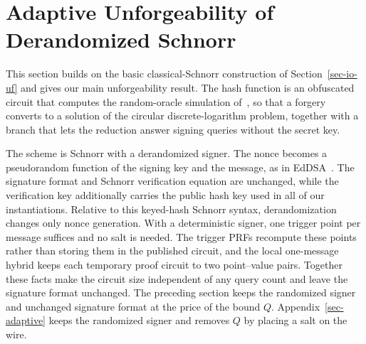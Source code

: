 \section{Adaptive Unforgeability of Derandomized Schnorr} \label{sec-derand}


This section builds on the basic classical-Schnorr construction of Section~\ref{sec-io-uf} and gives our main unforgeability result. The hash function is an obfuscated circuit that computes the random-oracle simulation of~\cite{C:CFOS25}, so that a forgery converts to a solution of the circular discrete-logarithm problem, together with a branch that lets the reduction answer signing queries without the secret key.

The scheme is Schnorr with a derandomized signer. The nonce becomes a pseudorandom function of the signing key and the message, as in EdDSA~\cite{eddsa}. The signature format and Schnorr verification equation are unchanged, while the verification key additionally carries the public hash key used in all of our instantiations. Relative to this keyed-hash Schnorr syntax, derandomization changes only nonce generation. With a deterministic signer, one trigger point per message suffices and no salt is needed. The trigger PRFs recompute these points rather than storing them in the published circuit, and the local one-message hybrid keeps each temporary proof circuit to two point--value pairs. Together these facts make the circuit size independent of any query count and leave the signature format unchanged. The preceding section keeps the randomized signer and unchanged signature format at the price of the bound $Q$. Appendix~\ref{sec-adaptive} keeps the randomized signer and removes $Q$ by placing a salt on the wire.

